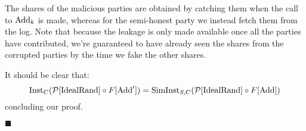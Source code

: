 \begin{claim}
    The shares of the malicious parties are obtained by catching them
    when the call to $\text{Add}_k$ is made, whereas for the semi-honest party
    we instead fetch them from the log.
    Note that because the leakage is only made available once all the parties
    have contributed, we're guaranteed to have already seen the shares
    from the corrupted parties by the time we fake the other shares.

    It should be clear that:
    $$
    \text{Inst}_C(\mathcal{P}[\text{IdealRand}] \circ F[\text{Add}']) = 
    \text{SimInst}_{S, C}(\mathcal{P}[\text{IdealRand}] \circ F[\text{Add}])
    $$
    concluding our proof.

    $\blacksquare$
\end{claim}